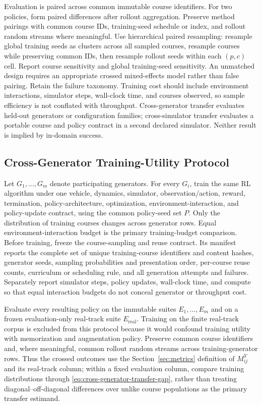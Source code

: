 Evaluation is paired across common immutable course identifiers. For two policies,
form paired differences after rollout aggregation. Preserve method pairings with common
course IDs, training-seed schedule or index, and rollout random streams where
meaningful. Use hierarchical paired resampling: resample global training seeds as
clusters across all sampled courses, resample courses while preserving common IDs, then
resample rollout seeds within each $(p,c)$ cell. Report course sensitivity and global
training-seed sensitivity. An unmatched design requires an appropriate crossed
mixed-effects model rather than false pairing. Retain the failure taxonomy.
Training cost should include environment interactions, simulator steps, wall-clock
time, and courses observed, so sample efficiency is not conflated with throughput.
Cross-generator transfer evaluates held-out generators or configuration families;
cross-simulator transfer evaluates a portable course and policy contract in a second
declared simulator. Neither result is implied by in-domain success.

\subsection{Cross-Generator Training-Utility Protocol}

Let $G_1,\ldots,G_m$ denote participating generators. For every $G_i$, train the
same RL algorithm under one vehicle, dynamics, simulator, observation/action, reward,
termination, policy-architecture, optimization, environment-interaction, and
policy-update contract, using the common policy-seed set $P$. Only the distribution
of training courses changes across generator rows. Equal environment-interaction
budget is the primary training-budget comparison. Before training, freeze the
course-sampling and reuse contract. Its manifest reports the complete set of unique
training-course identifiers and content hashes, generator seeds, sampling
probabilities and presentation order, per-course reuse counts, curriculum or
scheduling rule, and all generation attempts and failures. Separately report
simulator steps, policy updates, wall-clock time, and compute so that equal
interaction budgets do not conceal generator or throughput cost.

Evaluate every resulting policy on the immutable suites $E_1,\ldots,E_m$ and on a
frozen evaluation-only real-track suite $E_{\mathrm{real}}$. Training on the finite
real-track corpus is excluded from this protocol because it would confound training
utility with memorization and augmentation policy. Preserve common course identifiers
and, where meaningful, common rollout random streams across training-generator rows.
Thus the crossed outcomes use the Section~\ref{sec:metrics} definition of $M^Y_{ij}$
and its real-track column; within a fixed evaluation column, compare training
distributions through \cref{eq:cross-generator-transfer-gap}, rather than treating
diagonal--off-diagonal differences over unlike course populations as the primary
transfer estimand.

